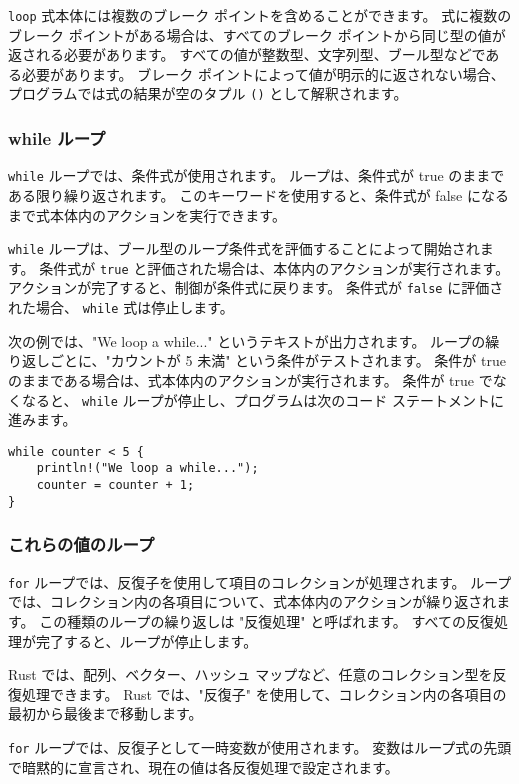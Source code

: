 \texttt{loop} 式本体には複数のブレーク ポイントを含めることができます。 式に複数のブレーク ポイントがある場合は、すべてのブレーク ポイントから同じ型の値が返される必要があります。 すべての値が整数型、文字列型、ブール型などである必要があります。 ブレーク ポイントによって値が明示的に返されない場合、プログラムでは式の結果が空のタプル \texttt{()} として解釈されます。

\subsubsection{while ループ}

\texttt{while} ループでは、条件式が使用されます。 ループは、条件式が true のままである限り繰り返されます。 このキーワードを使用すると、条件式が false になるまで式本体内のアクションを実行できます。

\texttt{while} ループは、ブール型のループ条件式を評価することによって開始されます。 条件式が \texttt{true} と評価された場合は、本体内のアクションが実行されます。 アクションが完了すると、制御が条件式に戻ります。 条件式が \texttt{false} に評価された場合、 \texttt{while} 式は停止します。

次の例では、"We loop a while..." というテキストが出力されます。 ループの繰り返しごとに、"カウントが 5 未満" という条件がテストされます。 条件が true のままである場合は、式本体内のアクションが実行されます。 条件が true でなくなると、 \texttt{while} ループが停止し、プログラムは次のコード ステートメントに進みます。


\begin{lstlisting}[numbers=none]
while counter < 5 {
    println!("We loop a while...");
    counter = counter + 1;
}
\end{lstlisting}

\subsubsection{これらの値のループ}

\texttt{for} ループでは、反復子を使用して項目のコレクションが処理されます。 ループでは、コレクション内の各項目について、式本体内のアクションが繰り返されます。 この種類のループの繰り返しは "反復処理" と呼ばれます。 すべての反復処理が完了すると、ループが停止します。

Rust では、配列、ベクター、ハッシュ マップなど、任意のコレクション型を反復処理できます。 Rust では、"反復子" を使用して、コレクション内の各項目の最初から最後まで移動します。

\texttt{for} ループでは、反復子として一時変数が使用されます。 変数はループ式の先頭で暗黙的に宣言され、現在の値は各反復処理で設定されます。

